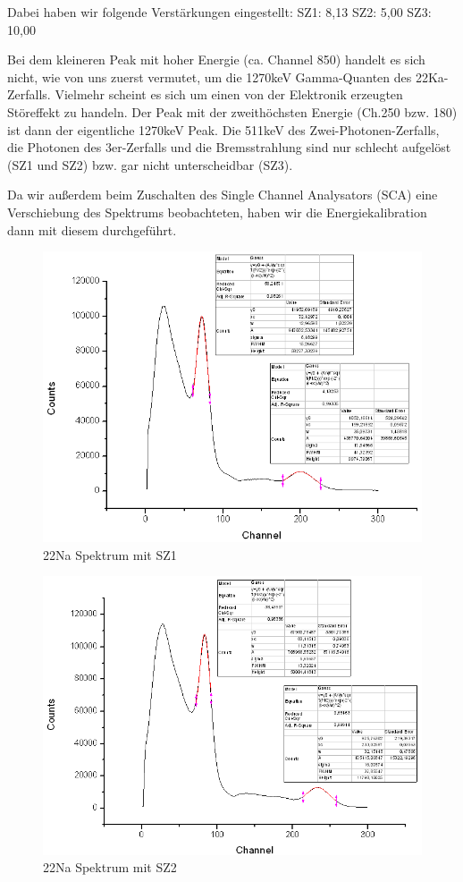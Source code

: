 Dabei haben wir folgende Verstärkungen eingestellt:
SZ1: 8,13
SZ2: 5,00
SZ3: 10,00

Bei dem kleineren Peak mit hoher Energie (ca. Channel 850) handelt es sich nicht, wie von uns zuerst vermutet, um die 1270keV Gamma-Quanten des 22Ka-Zerfalls. Vielmehr scheint es sich um einen von der Elektronik erzeugten Störeffekt zu handeln. Der Peak mit der zweithöchsten Energie (Ch.250 bzw. 180) ist dann der eigentliche 1270keV Peak. Die 511keV des Zwei-Photonen-Zerfalls, die Photonen des 3er-Zerfalls und die Bremsstrahlung sind nur schlecht aufgelöst (SZ1 und SZ2) bzw. gar nicht unterscheidbar (SZ3).

Da wir außerdem beim Zuschalten des Single Channel Analysators (SCA) eine Verschiebung des Spektrums beobachteten, haben wir die Energiekalibration dann mit diesem durchgeführt.
\begin{figure}
 \includegraphics[width=\textwidth]{Graphen/SZ1.png}
 \caption{22Na Spektrum mit SZ1}
\end{figure}

\begin{figure}
 \includegraphics[width=\textwidth]{Graphen/SZ2.png}
 \caption{22Na Spektrum mit SZ2}
\end{figure}


